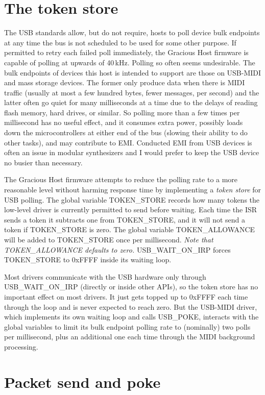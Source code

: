 \section{The token store}

The USB standards allow, but do not require, hosts to poll device bulk
endpoints at any time the bus is not scheduled to be used for some other
purpose.  If permitted to retry each failed poll immediately, the Gracious
Host firmware is capable of polling at upwards of 40\,kHz.  Polling so often
seems undesirable.  The bulk endpoints of devices this host is intended to
support are those on USB-MIDI and mass storage devices.  The former only
produce data when there is MIDI traffic (usually at most a few hundred
bytes, fewer messages, per second) and the latter often go quiet for many
milliseconds at a time due to the delays of reading flash memory, hard
drives, or similar.  So polling more than a few times per millisecond has no
useful effect, and it consumes extra power, possibly loads down the
microcontrollers at either end of the bus (slowing their ability to do other
tasks), and may contribute to EMI.  Conducted EMI from USB devices is often
an issue in modular synthesizers and I would prefer to keep the USB device
no busier than necessary.

The Gracious Host firmware attempts to reduce the polling rate to a more
reasonable level without harming response time by implementing a \emph{token
store} for USB polling.  The global variable TOKEN\_STORE records how many
tokens the low-level driver is currently permitted to send before waiting. 
Each time the ISR sends a token it subtracts one from TOKEN\_STORE, and it
will not send a token if TOKEN\_STORE is zero.  The global variable
TOKEN\_ALLOWANCE will be added to TOKEN\_STORE once per millisecond. 
\emph{Note that TOKEN\_ALLOWANCE defaults to zero.} USB\_WAIT\_ON\_IRP
forces TOKEN\_STORE to 0xFFFF inside its waiting loop.

Most drivers communicate with the USB hardware only through
USB\_WAIT\_ON\_IRP (directly or inside other APIs), so the token store has
no important effect on most drivers.  It just gets topped up to 0xFFFF each
time through the loop and is never expected to reach zero.  But the USB-MIDI
driver, which implements its own waiting loop and calls USB\_POKE, interacts
with the global variables to limit its bulk endpoint polling rate to
(nominally) two polls per millisecond, plus an additional one each time
through the MIDI background processing.

\section{Packet send and poke}

